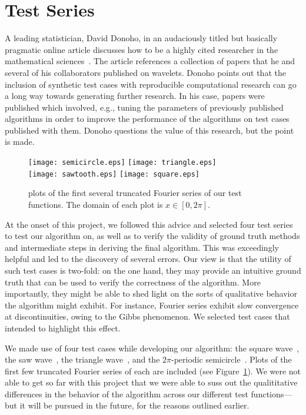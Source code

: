 \section{Test Series}

A leading statistician, David Donoho, in an audaciously titled but
basically pragmatic online article discusses how to be a highly cited
researcher in the mathematical
sciences~\cite{online:how-to-be-highly-cited}. The article references
a collection of papers that he and several of his collaborators
published on wavelets. Donoho points out that the inclusion of
synthetic test cases with reproducible computational research can go a
long way towards generating further research. In his case, papers were
published which involved, e.g., tuning the parameters of previously
published algorithms in order to improve the performance of the
algorithms on test cases published with them. Donoho questions the
value of this research, but the point is made.

\begin{figure}[h]
  \centering
  \texttt{[image: semicircle.eps]} \texttt{[image: triangle.eps]} \\
  \texttt{[image: sawtooth.eps]} \texttt{[image: square.eps]} \\
  \caption{plots of the first several truncated Fourier series of our
    test functions. The domain of each plot is $x \in [0, 2\pi]$.}
  \label{fig:test-series}
\end{figure}

At the onset of this project, we followed this advice and selected
four test series to test our algorithm on, as well as to verify the
validity of ground truth methods and intermediate steps in deriving
the final algorithm. This was exceedingly helpful and led to the
discovery of several errors. Our view is that the utility of such test
cases is two-fold: on the one hand, they may provide an intuitive
ground truth that can be used to verify the correctness of the
algorithm. More importantly, they might be able to shed light on the
sorts of qualitative behavior the algorithm might exhibit. For
instance, Fourier series exhibit slow convergence at discontinuities,
owing to the Gibbs phenomenon. We selected test cases that intended to
highlight this effect.

We made use of four test cases while developing our algorithm: the
square wave~\cite{online:mathworld-fourier-series-square}, the saw
wave~\cite{online:mathworld-fourier-series-sawtooth}, the triangle
wave~\cite{online:mathworld-fourier-series-triangle}, and the
$2\pi$-periodic
semicircle~\cite{online:mathworld-fourier-series-semicircle}. Plots of
the first few truncated Fourier series of each are included (see
Figure~\ref{fig:test-series}). We were not able to get so far with
this project that we were able to suss out the qualititative
differences in the behavior of the algorithm across our different test
functions\----but it will be pursued in the future, for the reasons
outlined earlier.
